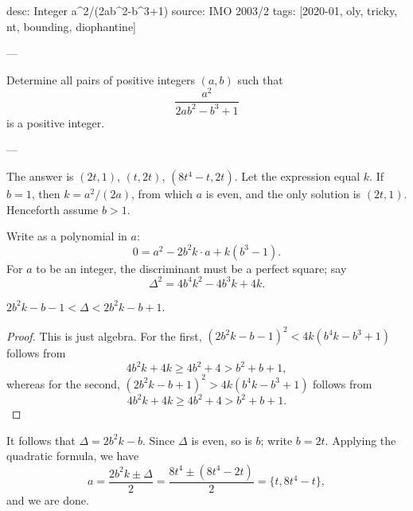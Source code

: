 desc: Integer a^2/(2ab^2-b^3+1)
source: IMO 2003/2
tags: [2020-01, oly, tricky, nt, bounding, diophantine]

---

Determine all pairs of positive integers $(a,b)$ such that \[\frac{a^2}{2ab^2-b^3+1}\]
is a positive integer.

---

The answer is $(2t,1)$, $(t,2t)$, $(8t^4-t,2t)$. Let the expression equal $k$. If $b=1$, then $k=a^2/(2a)$, from which $a$ is even, and the only solution is $(2t,1)$. Henceforth assume $b>1$.

Write as a polynomial in $a$: \[0=a^2-2b^2k\cdot a+k(b^3-1).\]
For $a$ to be an integer, the discriminant must be a perfect square; say \[\Delta^2=4b^4k^2-4b^3k+4k.\]
\begin{claim*}
    $2b^2k-b-1<\Delta<2b^2k-b+1$.
\end{claim*}
\begin{proof}
    This is just algebra. For the first, $(2b^2k-b-1)^2<4k(b^4k-b^3+1)$ follows from \[4b^2k+4k\ge4b^2+4>b^2+b+1,\]
    whereas for the second, $(2b^2k-b+1)^2>4k(b^4k-b^3+1)$ follows from \[4b^2k+4k\ge4b^2+4>b^2+b+1.\]
\end{proof}

It follows that $\Delta=2b^2k-b$. Since $\Delta$ is even, so is $b$; write $b=2t$. Applying the quadratic formula, we have \[a=\frac{2b^2k\pm\Delta}2=\frac{8t^4\pm\left(8t^4-2t\right)}2=\{t,8t^4-t\},\]
and we are done.
